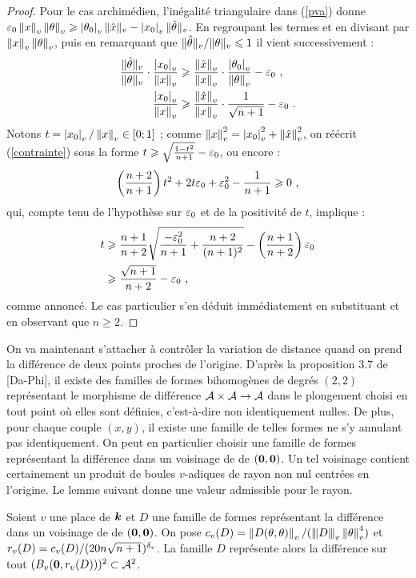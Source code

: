 \begin{proof}
  Pour le cas archimédien, l'inégalité triangulaire dans (\ref{pva}) donne
  $\varepsilon_0 \left\lVert x\right\rVert_{v}\left\lVert\theta\right\rVert_{v}  \geqslant \left\lvert\theta_0\right\rvert_{v}\|\hat{x}\|_{v} -
  \left\lvert x_0\right\rvert_{v}\|\hat{\theta}\|_{v} $. En regroupant les termes et en divisant par
  $\left\lVert x\right\rVert_{v}\left\lVert\theta\right\rVert_{v}$, puis en remarquant que $\|\hat{\theta}\|_{v}/\|\theta\|_{v} \leqslant
  1$ il vient successivement :
  \begin{align}
  \frac{\|\hat{\theta}\|_{v}}{\|\theta\|_{v}} \cdot \frac{\left\lvert x_0\right\rvert_{v}}{\left\lVert x\right\rVert_{v}}
  & \geqslant \frac{\left\lVert\hat{x}\right\rVert_{v}}{\left\lVert x\right\rVert_{v}}\cdot \frac{\left\lvert\theta_0\right\rvert_{v}}{\left\lVert\theta\right\rVert_{v}} -
  \varepsilon_0 \text{ ,} \notag \\
  \frac{\left\lvert x_0\right\rvert_{v}}{\left\lVert x\right\rVert_{v}} & \geqslant
  \frac{\left\lVert\hat{x}\right\rVert_{v}}{\left\lVert x\right\rVert_{v}}\cdot\frac{1}{\sqrt{n+1}} - \varepsilon_0 \text{ .}
  \label{contrainte}
  \end{align}
  Notons $t = \left\lvert x_0\right\rvert_{v}/\left\lVert x\right\rVert_{v} \in [0; 1]$ ; comme $\left\lVert x\right\rVert_{v}^2 = \left\lvert x_0\right\rvert_{v}^2 +
  \left\lVert\hat{x}\right\rVert_{v}^2$, on réécrit (\ref{contrainte}) sous la forme $t \geqslant
  \sqrt{\frac{1-t^2}{n+1}}-\varepsilon_0$, ou encore :
  \[
  \left(\frac{n+2}{n+1}\right)t^2 + 2t\varepsilon_0 + \varepsilon_0^2 - \frac{1}{n+1} \geqslant
  0 \text{ ,}
  \]
  qui, compte tenu de l'hypothèse sur $\varepsilon_0$ et de la positivité de $t$,
  implique :
  \begin{align*}
  t & \geqslant \frac{n+1}{n+2}\sqrt{\frac{-\varepsilon_0^2}{n+1}+\frac{n+2}{(n+1)^2}} -
  \left(\frac{n+1}{n+2}\right)\varepsilon_0\\
  & \geqslant \frac{\sqrt{n+1}}{n+2} - \varepsilon_0 \text{ ,}
  \end{align*}
  comme annoncé. Le cas particulier s'en déduit immédiatement en substituant
  et en observant que $n \ge 2$.
\end{proof}

On va maintenant s'attacher à contrôler la variation de distance quand on
prend la différence de deux points proches de l'origine. D'après la
proposition 3.7 de [Da-Phi], il existe des familles de formes bihomogènes de
degrés $(2, 2)$ représentant le morphisme de différence $\mathcal{A}\times\mathcal{A} \to \mathcal{A}$
dans le plongement choisi en tout point où elles sont définies, c'est-à-dire
non identiquement nulles. De plus, pour chaque couple $(x, y)$, il existe une
famille de telles formes ne s'y annulant pas identiquement. On peut en
particulier choisir une famille de formes représentant la différence dans un
voisinage de  de $({\boldsymbol{0}}, {\boldsymbol{0}})$. Un tel voisinage contient
certainement un produit de boules $v$-adiques de rayon non nul centrées en
l'origine. Le lemme suivant donne une valeur admissible pour le rayon.

\begin{lem} \label{rayonRel}
  Soient $v$ une place de $\boldsymbol{k}$ et $D$ une famille de formes représentant la
  différence dans un voisinage de  de $({\boldsymbol{0}}, {\boldsymbol{0}})$. On pose
  $c_v(D) = \left\lVert D(\theta, \theta)\right\rVert_{v}/(\left\lvert\hspace{-1pt} \left\lvert\hspace{-1pt} \left\lvert D\right\rvert \hspace{-1pt}\right\rvert \hspace{-1pt}\right\rvert_{v}\left\lVert\theta\right\rVert_{v}^4)$ et $r_v(D) =
  c_v(D)/(20n\sqrt{n+1})^{\delta_v}$. La famille $D$ représente alors la différence
  sur tout $(B_v({\boldsymbol{0}}, r_v(D)))^2 \subset \mathcal{A}^2$.
\end{lem}

